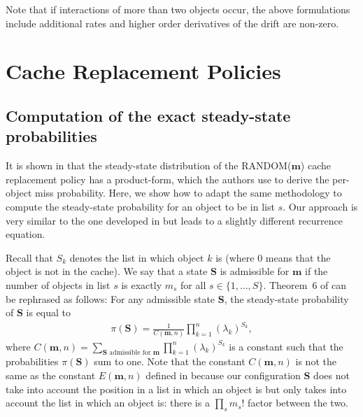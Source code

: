 \documentclass[acmsmall]{acmart}
\newcommand\bm{\mathbf{m}}
\newcommand\bS{\mathbf{S}}
\begin{document}
Note that if interactions of more than two objects occur, the above formulations include additional rates and higher order derivatives of the drift are non-zero. 


\section{Cache Replacement Policies}


\subsection{Computation of the exact steady-state probabilities}
\label{apx:cache_adaptation}

It is shown in \cite{gastTransientSteadystateRegime2015} that the steady-state distribution of the RANDOM($\bm$) cache replacement policy has a product-form, which the authors use to derive the per-object miss probability. Here, we show how to adapt the same methodology to compute the steady-state probability for an object to be in list $s$. Our approach is very similar to the one developed in \cite{gastTransientSteadystateRegime2015} but leads to a slightly different recurrence equation.

Recall that $S_k$ denotes the list in which object $k$ is (where $0$ means that the object is not in the cache). We say that a state $\bS$ is admissible for $\bm$ if the number of objects in list $s$ is exactly $m_s$ for all $s\in\{1,\dots ,S\}$. Theorem~6 of \cite{gastTransientSteadystateRegime2015} can be rephrased as follows: For any admissible state $\bS$, the steady-state probability of $\bS$ is equal to
\begin{align*}
  \pi(\bS) = \frac1{C(\bm,n)}\prod_{k=1}^n (\lambda_k)^{S_k},
\end{align*}
where $C(\bm,n)=\sum_{\text{$\bS$ admissible for $\bm$}}\prod_{k=1}^n (\lambda_k)^{S_k}$ is a constant such that the probabilities $\pi(\bS)$ sum to one. Note that the constant $C(\bm,n)$ is not the same as the constant $E(\bm,n)$ defined in \cite{gastTransientSteadystateRegime2015} because our configuration $\bS$ does not take into account the position in a list in which an object is but only takes into account the list in which an object is: there is a $\prod_s m_s!$ factor between the two.
\end{document}
